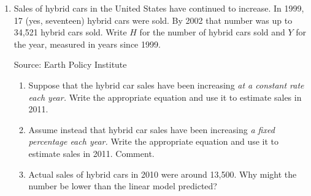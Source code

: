 \begin{enumerate}
\item  Sales of hybrid cars in the United States have continued to increase.  In 1999, 17 (yes, seventeen) hybrid cars were sold.  By 2002 that number was up to 34,521 hybrid cars sold. Write $H$ for the number of hybrid cars sold and $Y$ for the year, measured in years since 1999.  
\hfill \begin{footnotesize} Source: Earth Policy Institute \end{footnotesize}
\begin{enumerate}
\item Suppose that the hybrid car sales have been increasing \emph{at a constant rate each year.}  Write the appropriate equation and use it to estimate sales in 2011. 
\item Assume instead that hybrid car sales have been increasing \emph{a fixed percentage each year.} Write the appropriate equation and use it to estimate sales in 2011.  Comment.
\item Actual sales of hybrid cars in 2010 were around 13,500.  Why might the number be lower than the linear model predicted?
\end{enumerate}  


\end{enumerate}